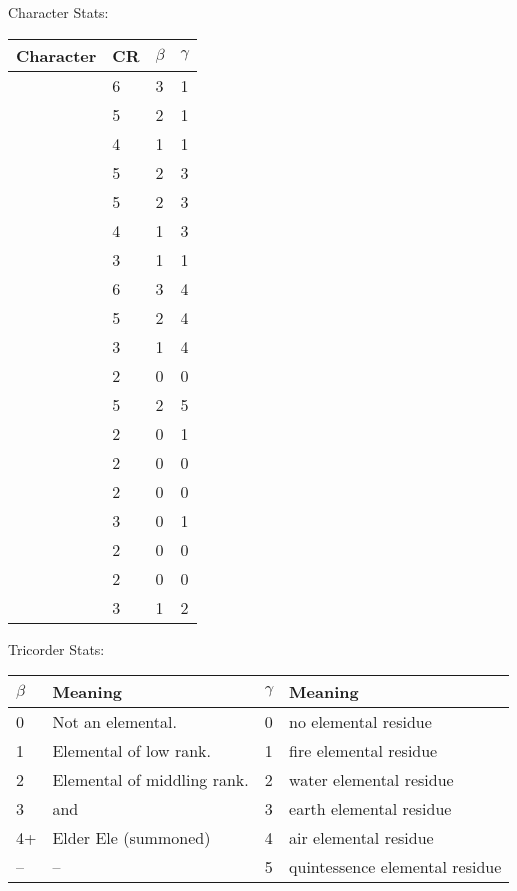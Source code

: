 \documentclass[green]{elementals}
\begin{document}
\name{\gStats{}}

Character Stats:\\

\begin{tabular}{ l || l |  l | l |}
  Character & CR & $\beta$ & $\gamma$   \\ \hline \hline
  \cQueen{} & 6 & 3 & 1 \\ \hline
  \cPyro{} & 5 & 2 & 1  \\ \hline
  \cJuliet{} & 4 & 1 & 1  \\ \hline
  \cLoyal{} & 5 & 2 & 3  \\ \hline
  \cRogue{} & 5 & 2 & 3  \\ \hline
  \cMinion{} & 4 & 1 & 3  \\ \hline
  \cMiniEarth{} & 3 & 1 & 1  \\ \hline
  \cKing{} & 6 & 3 & 4  \\ \hline
  \cNaturalist{} & 5 & 2 & 4  \\ \hline
  \cMiniAir{} & 3 & 1 & 4  \\ \hline
  \cGD{} & 2 & 0 & 0  \\ \hline
  \cAvatar{} & 5 & 2 & 5  \\ \hline
  \cDema{} & 2 & 0 & 1  \\ \hline
  \cLeader{} & 2 & 0 & 0  \\ \hline
  \cMS{} & 2 & 0 & 0  \\ \hline
  \cRomeo{} & 3 & 0 & 1  \\ \hline
  \cScientist{} & 2 & 0 & 0  \\ \hline
  \cDiplomat{} & 2 & 0 & 0  \\ \hline
  \cMiniWater{} & 3 & 1 & 2  \\ \hline
\end{tabular}


Tricorder Stats:\\

\begin{tabular}{ l | l ||  l | l |}
  $\beta$ & Meaning & $\gamma$ & Meaning   \\ \hline \hline
  0 & Not an elemental. & 0 & no elemental residue   \\ \hline
  1 & Elemental of low rank. & 1 & fire elemental residue   \\ \hline
  2 & Elemental of middling rank. & 2 & water elemental residue  \\ \hline
  3 & \cKing{} and \cQueen{} & 3 & earth elemental residue   \\ \hline
  4+ & Elder Ele (summoned) & 4 & air elemental residue  \\ \hline
  --& -- & 5 & quintessence elemental residue   \\ \hline
\end{tabular}
\end{document}
